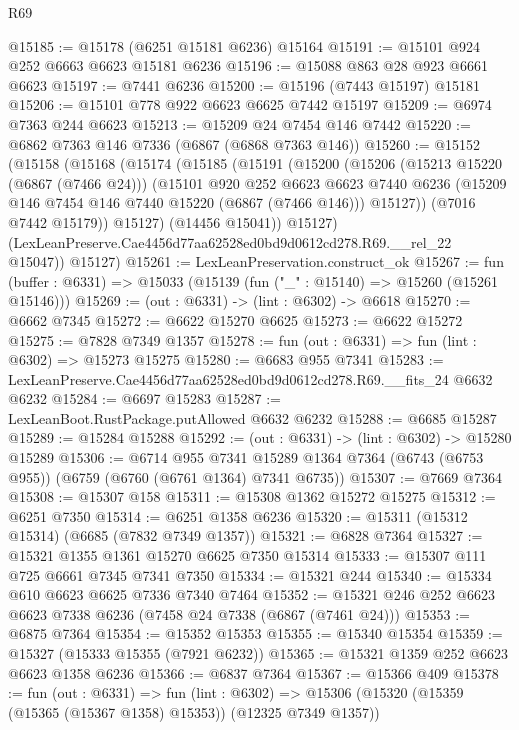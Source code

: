 \begin{lexlean}{R69}
\begin{coremodule}
{@15185 := @15178 (@6251 @15181 @6236) @15164
@15191 := @15101 @924 @252 @6663 @6623 @15181 @6236
@15196 := @15088 @863 @28 @923 @6661 @6623
@15197 := @7441 @6236
@15200 := @15196 (@7443 @15197) @15181
@15206 := @15101 @778 @922 @6623 @6625 @7442 @15197
@15209 := @6974 @7363 @244 @6623
@15213 := @15209 @24 @7454 @146 @7442
@15220 := @6862 @7363 @146 @7336 (@6867 (@6868 @7363 @146))
@15260 := @15152
    (@15158
      (@15168
        (@15174
          (@15185
            (@15191
              (@15200
                (@15206
                  (@15213 @15220 (@6867 (@7466 @24)))
                  (@15101
                    @920
                    @252
                    @6623
                    @6623
                    @7440
                    @6236
                    (@15209 @146 @7454 @146 @7440 @15220 (@6867 (@7466 @146)))
                    @15127))
                (@7016 @7442 @15179))
              @15127)
            (@14456 @15041))
          @15127)
        (LexLeanPreserve.Cae4456d77aa62528ed0bd9d0612cd278.R69.__rel_22 @15047))
      @15127)
@15261 := LexLeanPreservation.construct_ok
@15267 := fun (buffer : @6331) => @15033 (@15139 (fun ("_" : @15140) => @15260 (@15261 @15146)))
@15269 := (out : @6331) -> (lint : @6302) -> @6618
@15270 := @6662 @7345
@15272 := @6622 @15270 @6625
@15273 := @6622 @15272
@15275 := @7828 @7349 @1357
@15278 := fun (out : @6331) => fun (lint : @6302) => @15273 @15275
@15280 := @6683 @955 @7341
@15283 := LexLeanPreserve.Cae4456d77aa62528ed0bd9d0612cd278.R69.__fits_24 @6632 @6232
@15284 := @6697 @15283
@15287 := LexLeanBoot.RustPackage.putAllowed @6632 @6232
@15288 := @6685 @15287
@15289 := @15284 @15288
@15292 := (out : @6331) -> (lint : @6302) -> @15280 @15289
@15306 := @6714
    @955
    @7341
    @15289
    @1364
    @7364
    (@6743 (@6753 @955))
    (@6759 (@6760 (@6761 @1364) @7341 @6735))
@15307 := @7669 @7364
@15308 := @15307 @158
@15311 := @15308 @1362 @15272 @15275
@15312 := @6251 @7350
@15314 := @6251 @1358 @6236
@15320 := @15311 (@15312 @15314) (@6685 (@7832 @7349 @1357))
@15321 := @6828 @7364
@15327 := @15321 @1355 @1361 @15270 @6625 @7350 @15314
@15333 := @15307 @111 @725 @6661 @7345 @7341 @7350
@15334 := @15321 @244
@15340 := @15334 @610 @6623 @6625 @7336 @7340 @7464
@15352 := @15321 @246 @252 @6623 @6623 @7338 @6236 (@7458 @24 @7338 (@6867 (@7461 @24)))
@15353 := @6875 @7364
@15354 := @15352 @15353
@15355 := @15340 @15354
@15359 := @15327 (@15333 @15355 (@7921 @6232))
@15365 := @15321 @1359 @252 @6623 @6623 @1358 @6236
@15366 := @6837 @7364
@15367 := @15366 @409
@15378 := fun (out : @6331) =>
  fun (lint : @6302) => @15306 (@15320 (@15359 (@15365 (@15367 @1358) @15353)) (@12325 @7349 @1357))
}
\end{coremodule}
\end{lexlean}
